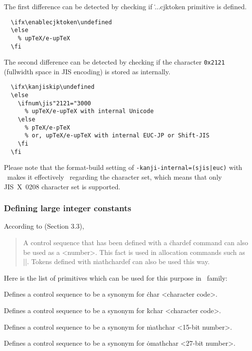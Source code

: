 \documentclass[a4paper,11pt,dvipdfmx]{article}
\def\code#1{\texttt{#1}}
\begin{document}
The first difference can be detected by checking if
\.{...cjktoken} primitive is defined.
\begin{verbatim}
  \ifx\enablecjktoken\undefined
  \else
    % upTeX/e-upTeX
  \fi
\end{verbatim}

The second difference can be detected by checking if
the character \code{0x2121} (fullwidth space in JIS encoding)
is stored as  internally.
\begin{verbatim}
  \ifx\kanjiskip\undefined
  \else
    \ifnum\jis"2121="3000
      % upTeX/e-upTeX with internal Unicode
    \else
      % pTeX/e-pTeX
      % or, upTeX/e-upTeX with internal EUC-JP or Shift-JIS
    \fi
  \fi
\end{verbatim}
Please note that
the format-build setting of \verb+-kanji-internal=(sjis|euc)+ with
\upTeX\ makes it effectively \pTeX\ regarding the character set,
which means that only JIS~X~0208 character set is supported.


\subsubsection{Defining large integer constants}
\label{chardef}

According to \cite{topic} (Section 3.3),
\begin{quote}
A control sequence that has been defined with a \.{chardef} command
can also be used as a <number>.
This fact is used in allocation commands such as |\newbox|.
Tokens defined with \.{mathchardef} can also be used this way.
\end{quote}
Here is the list of primitives which can be used for this purpose
in \pTeX\ family:
\begin{simplelist}
 \csitem[\.{chardef} <control sequence>=<character code>]
  Defines a control sequence to be a synonym for
  \.{char} <character code>.

 \csitem[\.{kchardef} <control sequence>=<character code> (for \upTeX/\eupTeX)]
  Defines a control sequence to be a synonym for
  \.{kchar} <character code>.

 \csitem[\.{mathchardef} <control sequence>=<15-bit number>]
  Defines a control sequence to be a synonym for
  \.{mathchar} <15-bit number>.

 \csitem[\.{omathchardef} <control sequence>=<27-bit number> (for \epTeX/\eupTeX)]
  Defines a control sequence to be a synonym for
  \.{omathchar} <27-bit number>.
\end{simplelist}
\end{document}
